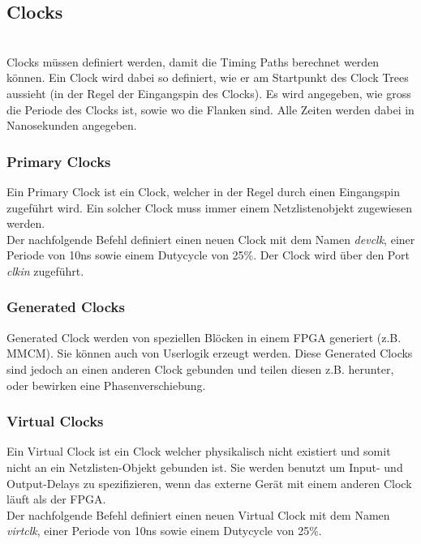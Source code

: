 \subsection{Clocks}$~$ \\
Clocks müssen definiert werden, damit die Timing Paths berechnet werden können. Ein Clock wird dabei so definiert, wie er am Startpunkt des Clock Trees aussieht (in der Regel der Eingangspin des Clocks). Es wird angegeben, wie gross die Periode des Clocks ist, sowie wo die Flanken sind. Alle Zeiten werden dabei in Nanosekunden angegeben.

\subsubsection{Primary Clocks}
Ein Primary Clock ist ein Clock, welcher in der Regel durch einen Eingangspin zugeführt wird. Ein solcher Clock muss immer einem Netzlistenobjekt zugewiesen werden. \\
Der nachfolgende Befehl definiert einen neuen Clock mit dem Namen \textit{devclk}, einer Periode von 10ns sowie einem Dutycycle von 25\%. Der Clock wird über den Port \textit{clkin} zugeführt.


\subsubsection{Generated Clocks}
Generated Clock werden von speziellen Blöcken in einem FPGA generiert (z.B. MMCM). Sie können auch von Userlogik erzeugt werden. Diese Generated Clocks sind jedoch an einen anderen Clock gebunden und teilen diesen z.B. herunter, oder bewirken eine Phasenverschiebung.

\subsubsection{Virtual Clocks}
Ein Virtual Clock ist ein Clock welcher physikalisch nicht existiert und somit nicht an ein Netzlisten-Objekt gebunden ist. Sie werden benutzt um Input- und Output-Delays zu spezifizieren, wenn das externe Gerät mit einem anderen Clock läuft als der FPGA. \\
Der nachfolgende Befehl definiert einen neuen Virtual Clock mit dem Namen \textit{virtclk}, einer Periode von 10ns sowie einem Dutycycle von 25\%.


